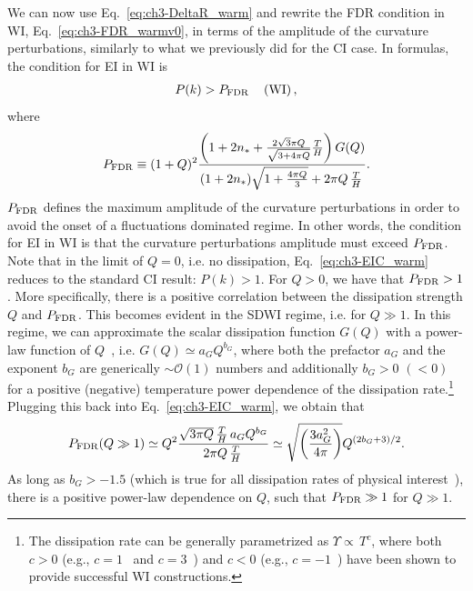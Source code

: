  We can now use Eq.~\ref{eq:ch3-DeltaR_warm} and rewrite the FDR condition in WI, Eq.~\ref{eq:ch3-FDR_warmv0}, in terms of the amplitude of the curvature perturbations, similarly to what we previously did for the CI case. In formulas, the condition for EI in WI is
%
\begin{eqnarray}
    P(k)> P_{\rm{FDR}} \,\,\,\,\,\,\,   ({\rm
 WI}) \, ,\label{eq:ch3-EIC_warm}
\end{eqnarray}
where
\begin{eqnarray}
    P_{\rm{FDR}}\equiv (1+Q)^2\frac{\left(1 + 2 n_{*}+\frac{2 \sqrt{3}
        \pi Q}{\sqrt{3+4 \pi Q}}
      \frac{T}{H}\right)G(Q)}{(1+2n_*)\sqrt{1+\frac{4\pi Q}{3}}+2\pi Q\,\frac{T}{H}\, }. \label{eq:ch3-P_FDR}
\end{eqnarray}
$P_{\rm{FDR}}$ defines the maximum amplitude of the curvature perturbations in order to avoid the onset of a fluctuations dominated regime. In other words, the condition for EI in WI is that the curvature perturbations amplitude must
exceed $P_{\rm{FDR}}$.
Note that in the limit of $Q=0$, i.e. no dissipation,
Eq.~\ref{eq:ch3-EIC_warm} reduces to the standard CI result: $P(k)>1$. For $Q>0$, we have that $P_{\rm{FDR}}>1$. More specifically, there
is a positive correlation between the dissipation strength $Q$ and
$P_{\rm{FDR}}$. This becomes evident in the SDWI regime, i.e. for
$Q\gg 1$. In this regime, we can approximate the scalar dissipation
function  $G(Q)$ with a power-law function of
$Q$~\cite{Montefalcone:2023pvh}, i.e.  $G(Q)\simeq a_G Q^{b_G}$, where both
the prefactor $a_G$ and the exponent $b_G$ are generically $\sim \mathcal{O}(1)$ numbers and additionally $b_G>0$ $(<0)$ for a positive (negative) temperature power
dependence of the dissipation rate.\footnote{The dissipation rate can be
generally parametrized as $\Upsilon\propto\,T^c$, where both $c>0$ (e.g.,
$c=1$~\cite{Bastero-Gil:2016qru} and $c=3$~\cite{Moss:2006gt}) and
$c<0$ (e.g., $c=-1$~\cite{Bastero-Gil:2019gao}) have been shown to
provide successful WI constructions.} Plugging this back into
Eq.~\ref{eq:ch3-EIC_warm}, we obtain that
%
\begin{equation}
    P_{\rm{FDR}}(Q\gg 1)\simeq Q^2\frac{\sqrt{3\pi
        Q}\,\frac{T}{H}\,a_G Q^{b_G}}{2\pi Q
     \,\frac{T}{H}\,}  \simeq
    \sqrt{\left(\frac{3a_G^2}{4\pi}\right)}Q^{(2b_G+3)/2}.
    \label{eq:ch3-EIC_SDwarm}
\end{equation}
%
As long as $b_G>-1.5$ (which is true for all dissipation rates of
physical interest~\cite{Montefalcone:2023pvh}), there is a positive
power-law dependence on $Q$, such that $P_{\rm{FDR}}\gg1$ for $Q\gg
1$.

